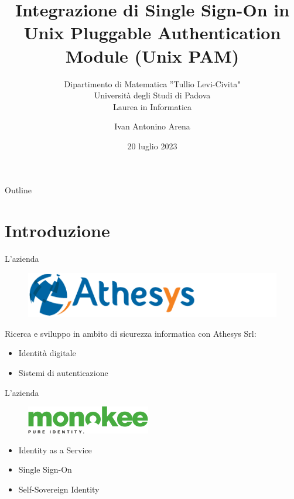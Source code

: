 \documentclass{beamer}
\title{Integrazione di Single Sign-On in Unix Pluggable Authentication Module (Unix PAM)}
\subtitle{Dipartimento di Matematica ”Tullio Levi-Civita" \\ Università degli Studi di Padova \\ Laurea in Informatica}
\author{Ivan Antonino Arena}
\date{20 luglio 2023}
\begin{document}
	\maketitle

	\begin{frame}{Outline}
		\tableofcontents
	\end{frame}


	\section{Introduzione}
	
	\begin{frame}{L'azienda}
		
		\begin{figure}[H] 
			\centering 
			\includegraphics[width=0.4\columnwidth]{immagini/logo-athesys} 
			\label{fig:athesys}
		\end{figure}
		
		Ricerca e sviluppo in ambito di sicurezza informatica con Athesys Srl:
		
		\begin{itemize}
			\item Identità digitale \vspace{.5em}
			\item Sistemi di autenticazione \vspace{.5em}
		\end{itemize}
	\end{frame}
	
	
	\begin{frame}{L'azienda}
		\begin{figure}[H] 
			\centering 
			\includegraphics[width=0.4\columnwidth]{immagini/logo-monokee} 
			\label{fig:monokee}
		\end{figure}


		\begin{itemize}
			\item Identity as a Service \vspace{.5em}
			\item Single Sign-On \vspace{.5em}
			\item Self-Sovereign Identity \vspace{.5em}
		\end{itemize}	
	\end{frame}
	
\end{document}
